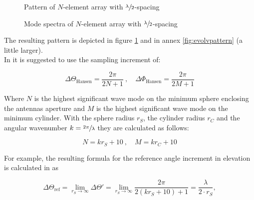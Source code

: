 \begin{figure}[h]
  \centering
  \centering
  \centering
\caption{Pattern of $N$-element array with $\sfrac{\lambda}{2}$-spacing}
\label{fig:evolvpattern2}
\end{figure}

\begin{figure}[h]
  \centering
  \centering
  \centering
\caption{Mode spectra of $N$-element array with $\sfrac{\lambda}{2}$-spacing}
\label{fig:evolvpattern3}
\end{figure}

The resulting pattern is depicted in figure \ref{fig:evolvpattern2} and in annex \ref{fig:evolvpattern} (a little larger).\\
In \cite{hansen} it is suggested to use the sampling increment of:

\begin{equation}
\Delta\Theta_\text{Hansen} = \frac{2\pi}{2N+1}\ , \quad \Delta\Phi_\text{Hansen}=\frac{2\pi}{2M+1}
\label{eq:refahansen}
\end{equation}

Where $N$ is the highest significant wave mode on the minimum sphere enclosing the antennas aperture and $M$ is the highest significant wave mode on the minimum cylinder. With the sphere radius $r_S$, the cylinder radius $r_C$ and the angular wavenumber $k = \sfrac{2\pi}{\lambda}$ they are calculated as follows:

\begin{equation}
N = kr_S+10\ , \quad M = kr_C+10
\end{equation}

For example, the resulting formula for the reference angle increment in elevation is calculated in \cite{2018arXiv180310993F} as

\begin{equation}
\Delta\Theta_{\text{ref}} = \lim_{r_S \to \infty}\Delta\Theta' = \lim_{r_S \to \infty} \frac{2\pi}{2\left(kr_S+10\right)+1} = \frac{\lambda}{2\cdot r_S},
\label{eq:hansenrefa}
\end{equation}

